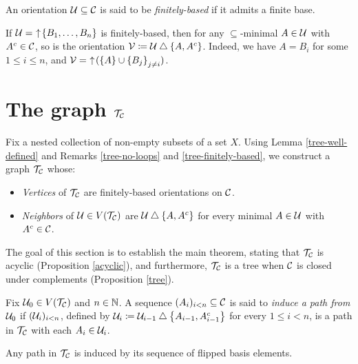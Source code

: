 \documentclass{amsart}
\begin{document}
    \begin{definition}
        An orientation $\mathcal{U}\subseteq\mathcal{C}$ is said to be \textit{finitely-based} if it admits a finite base.
    \end{definition}

    \begin{remark}\label{tree-finitely-based}
        If $\mathcal{U}=\,\,\uparrow\!\left\{B_1,\dots,B_n\right\}$ is finitely-based, then for any $\subseteq$-minimal $A\in\mathcal{U}$ with $A^c\in\mathcal{C}$, so is the orientation $\mathcal{V}\coloneqq\mathcal{U}\bigtriangleup\left\{A,A^c\right\}$. Indeed, we have $A=B_i$ for some $1\leq i\leq n$, and $\mathcal{V}=\,\,\uparrow\!(\left\{A\right\}\cup\left\{B_j\right\}_{j\neq i})$.
    \end{remark}

    \section{The graph $\mathcal{T}_{\mathcal{C}}$}

    Fix a nested collection of non-empty subsets of a set $X$. Using Lemma \ref{tree-well-defined} and Remarks \ref{tree-no-loops} and \ref{tree-finitely-based}, we construct a graph $\mathcal{T}_{\mathcal{C}}$ whose:
    \begin{itemize}
        \item \textit{Vertices} of $\mathcal{T}_{\mathcal{C}}$ are finitely-based orientations on $\mathcal{C}$.
        \item \textit{Neighbors} of $\mathcal{U}\in V(\mathcal{T}_{\mathcal{C}})$ are $\mathcal{U}\bigtriangleup\left\{A,A^c\right\}$ for every minimal $A\in\mathcal{U}$ with $A^c\in\mathcal{C}$.
    \end{itemize}

    The goal of this section is to establish the main theorem, stating that $\mathcal{T}_{\mathcal{C}}$ is acyclic (Proposition \ref{acyclic}), and furthermore, $\mathcal{T}_{\mathcal{C}}$ is a tree when $\mathcal{C}$ is closed under complements (Proposition \ref{tree}).

    \begin{definition}
        Fix $\mathcal{U}_0\in V(\mathcal{T}_{\mathcal{C}})$ and $n\in\mathbb{N}$. A sequence $(A_i)_{i<n}\subseteq\mathcal{C}$ is said to \textit{induce a path from $\mathcal{U}_0$} if $(\mathcal{U}_i)_{i<n}$, defined by $\mathcal{U}_i\coloneqq\mathcal{U}_{i-1}\bigtriangleup\left\{A_{i-1},A_{i-1}^c\right\}$ for every $1\leq i<n$, is a path in $\mathcal{T}_{\mathcal{C}}$ with each $A_i\in\mathcal{U}_i$.
    \end{definition}

    \begin{remark}
        Any path in $\mathcal{T}_{\mathcal{C}}$ is induced by its sequence of flipped basis elements.
    \end{remark}
\end{document}
